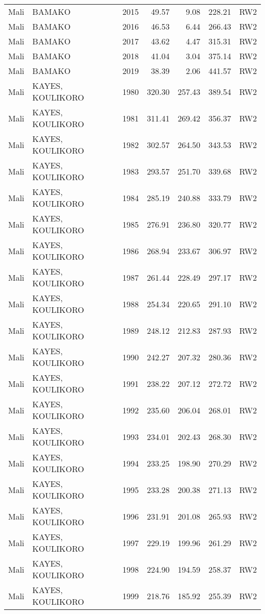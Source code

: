 \begin{longtable}{lllrrrl}
  Mali & BAMAKO & 2015 & 49.57 & 9.08 & 228.21 & RW2 \\ 
  Mali & BAMAKO & 2016 & 46.53 & 6.44 & 266.43 & RW2 \\ 
  Mali & BAMAKO & 2017 & 43.62 & 4.47 & 315.31 & RW2 \\ 
  Mali & BAMAKO & 2018 & 41.04 & 3.04 & 375.14 & RW2 \\ 
  Mali & BAMAKO & 2019 & 38.39 & 2.06 & 441.57 & RW2 \\ 
  Mali & KAYES, KOULIKORO & 1980 & 320.30 & 257.43 & 389.54 & RW2 \\ 
  Mali & KAYES, KOULIKORO & 1981 & 311.41 & 269.42 & 356.37 & RW2 \\ 
  Mali & KAYES, KOULIKORO & 1982 & 302.57 & 264.50 & 343.53 & RW2 \\ 
  Mali & KAYES, KOULIKORO & 1983 & 293.57 & 251.70 & 339.68 & RW2 \\ 
  Mali & KAYES, KOULIKORO & 1984 & 285.19 & 240.88 & 333.79 & RW2 \\ 
  Mali & KAYES, KOULIKORO & 1985 & 276.91 & 236.80 & 320.77 & RW2 \\ 
  Mali & KAYES, KOULIKORO & 1986 & 268.94 & 233.67 & 306.97 & RW2 \\ 
  Mali & KAYES, KOULIKORO & 1987 & 261.44 & 228.49 & 297.17 & RW2 \\ 
  Mali & KAYES, KOULIKORO & 1988 & 254.34 & 220.65 & 291.10 & RW2 \\ 
  Mali & KAYES, KOULIKORO & 1989 & 248.12 & 212.83 & 287.93 & RW2 \\ 
  Mali & KAYES, KOULIKORO & 1990 & 242.27 & 207.32 & 280.36 & RW2 \\ 
  Mali & KAYES, KOULIKORO & 1991 & 238.22 & 207.12 & 272.72 & RW2 \\ 
  Mali & KAYES, KOULIKORO & 1992 & 235.60 & 206.04 & 268.01 & RW2 \\ 
  Mali & KAYES, KOULIKORO & 1993 & 234.01 & 202.43 & 268.30 & RW2 \\ 
  Mali & KAYES, KOULIKORO & 1994 & 233.25 & 198.90 & 270.29 & RW2 \\ 
  Mali & KAYES, KOULIKORO & 1995 & 233.28 & 200.38 & 271.13 & RW2 \\ 
  Mali & KAYES, KOULIKORO & 1996 & 231.91 & 201.08 & 265.93 & RW2 \\ 
  Mali & KAYES, KOULIKORO & 1997 & 229.19 & 199.96 & 261.29 & RW2 \\ 
  Mali & KAYES, KOULIKORO & 1998 & 224.90 & 194.59 & 258.37 & RW2 \\ 
  Mali & KAYES, KOULIKORO & 1999 & 218.76 & 185.92 & 255.39 & RW2 \\ 

\end{longtable}
